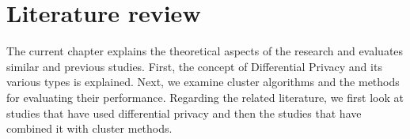 \chapter{Literature review}
The current chapter explains the theoretical aspects of the research and evaluates similar and previous studies.
First, the concept of Differential Privacy and its various types is explained.
Next, we examine cluster algorithms and the methods for evaluating their performance.
Regarding the related literature, we first look at studies that have used differential privacy and then the studies that have combined it with cluster methods.




